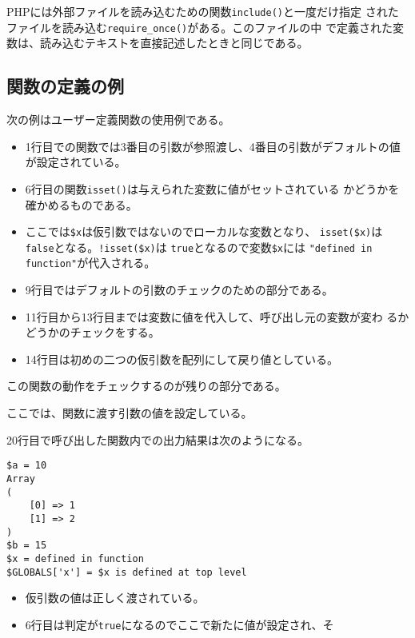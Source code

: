 PHPには外部ファイルを読み込むための関数\texttt{include()}と一度だけ指定
されたファイルを読み込む\texttt{require\_once()}がある。このファイルの中
で定義された変数は、読み込むテキストを直接記述したときと同じである。
\subsection{関数の定義の例}
\begin{Exec}\upshape
 次の例はユーザー定義関数の使用例である。
\begin{itemize}
 \item 1行目での関数では3番目の引数が参照渡し、4番目の引数がデフォルトの値
       が設定されている。 
 \item 6行目の関数\texttt{isset()}は与えられた変数に値がセットされている
       かどうかを確かめるものである。
 \item ここでは\Verb+$x+は仮引数ではないのでローカルな変数となり、
       \Verb+isset($x)+は\texttt{false}となる。\Verb+!isset($x)+は
       \texttt{true}となるので変数\Verb+$x+には
       \Verb+"defined in function"+が代入される。
 \item 9行目ではデフォルトの引数のチェックのための部分である。
 \item 11行目から13行目までは変数に値を代入して、呼び出し元の変数が変わ
       るかどうかのチェックをする。
 \item 14行目は初めの二つの仮引数を配列にして戻り値としている。
\end{itemize}
この関数の動作をチェックするのが残りの部分である。
 \iffalse
 \begin{listingcont}
$a = 10;
$as = array(1,2);
$b = 15;
$x = "\$x is defined at top level";
 \end{listingcont}
 \fi
 ここでは、関数に渡す引数の値を設定している。
 \iffalse
 \begin{listingcont}
example($a, $as, $b, true);
print "\$a = $a\n";
print_r($as);  
print "\$b = $b\n";
 \end{listingcont}
\fi
20行目で呼び出した関数内での出力結果は次のようになる。
\begin{Verbatim}
$a = 10
Array
(
    [0] => 1
    [1] => 2
)
$b = 15
$x = defined in function
$GLOBALS['x'] = $x is defined at top level
\end{Verbatim}
\begin{itemize}
 \item 仮引数の値は正しく渡されている。
 \item 6行目は判定が\texttt{true}になるのでここで新たに値が設定され、そ

\end{itemize}
\end{Exec}
